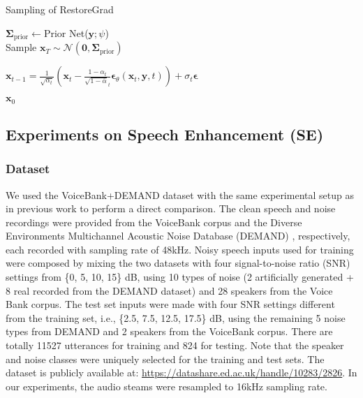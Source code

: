 \begin{minipage}{0.44\textwidth}
\begin{algorithm}[H]
    \footnotesize
    \caption{Sampling of RestoreGrad}
    $\boldsymbol{\Sigma}_{\text{prior}}\gets$Prior Net($\mathbf{y};\psi$) \\
    Sample $\mathbf{x}_T\sim \mathcal{N}(\mathbf{0},\boldsymbol{\Sigma}_{\text{prior}})$ \\
    {
        $\mathbf{x}_{t-1}=\frac{1}{\sqrt{\alpha_t}}\left(\mathbf{x}_t-\frac{1-\alpha_t}{\sqrt{1-\bar{\alpha}}_t}\boldsymbol{\epsilon}_{\theta}(\mathbf{x}_t,\mathbf{y},t)\right)+\sigma_t\boldsymbol{\epsilon}$
        
    }
    \Return $\mathbf{x}_0$
\label{algo: sampling}
\end{algorithm}
\end{minipage}


\subsection{Experiments on Speech Enhancement (SE)}
\subsubsection{Dataset}
We used the VoiceBank+DEMAND dataset \citep{valentini2016investigating} with the same experimental setup as in previous work \citep{pascual2017segan,phan2020improving,strauss2021flow,lu2022conditional} to perform a direct comparison. The clean speech and noise recordings were provided from the VoiceBank corpus \citep{veaux2013voice} and the Diverse Environments Multichannel Acoustic Noise Database (DEMAND) \citep{thiemann2013diverse}, respectively, each recorded with sampling rate of 48kHz. Noisy speech inputs used for training were composed by mixing the two datasets with four signal-to-noise ratio (SNR) settings from \{0, 5, 10, 15\} dB, using 10 types of noise (2 artificially generated + 8 real recorded from the DEMAND dataset) and 28 speakers from the Voice Bank corpus. The test set inputs were made with four SNR settings different from the training set, i.e., \{2.5, 7.5, 12.5, 17.5\} dB, using the remaining 5 noise types from DEMAND and 2 speakers from the VoiceBank corpus. There are totally 11527 utterances for training and
824 for testing. Note that the speaker and noise classes were uniquely selected for the training and test sets. The dataset is publicly available at: \url{https://datashare.ed.ac.uk/handle/10283/2826}. In our experiments, the audio steams were resampled to 16kHz sampling rate.

